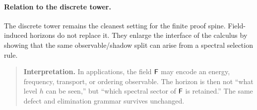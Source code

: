 \paragraph{Relation to the discrete tower.}
The discrete tower remains the cleanest setting for the finite proof spine.
Field-induced horizons do not replace it. They enlarge the interface of the
calculus by showing that the same observable/shadow split can arise from a
spectral selection rule.

\begin{quote}\small
\textbf{Interpretation.}
In applications, the field $\mathsf{F}$ may encode an energy, frequency,
transport, or ordering observable. The horizon is then not ``what level $h$
can be seen,'' but ``which spectral sector of $\mathsf{F}$ is retained.'' The
same defect and elimination grammar survives unchanged.
\end{quote}
